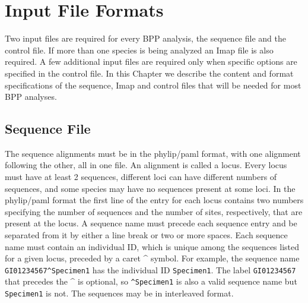 \documentclass{book}
\numberwithin{equation}{section} \renewcommand{\baselinestretch}{0.55}
\begin{document}
\chapter{Input File Formats} \label{files} Two input files are
required for every BPP analysis, the sequence file and the control
file. If more than one species is being analyzed an Imap file is
also required. A few additional input files are required only when
specific options are specified in the control file. In this
Chapter we describe the content and format specifications of the
sequence, Imap and control files that will be needed for most BPP
analyses.

\section{Sequence File} \label{seqfile} The sequence alignments
must be in the phylip/paml format, with one alignment following
the other, all in one file. An alignment is called a locus.  Every
locus must have at least 2 sequences, different loci can have
different numbers of sequences, and some species may have no
sequences present at some loci.  In the phylip/paml format the
first line of the entry for each locus contains two numbers
specifying the number of sequences and the number of sites,
respectively, that are present at the locus.  A sequence name must
precede each sequence entry and be separated from it by either a
line break or two or more spaces.  Each sequence name must contain
an individual ID, which is unique among the sequences listed for a
given locus, preceded by a caret \^{} symbol.  For example, the
sequence name \texttt{GI01234567\^{}Specimen1} has the individual
ID \texttt{Specimen1}.  The label \texttt{GI01234567} that
precedes the \^{} is optional, so \texttt{\^{}Specimen1} is also a
valid sequence name but \texttt{Specimen1} is not.  The sequences
may be in interleaved format.
\end{document}
